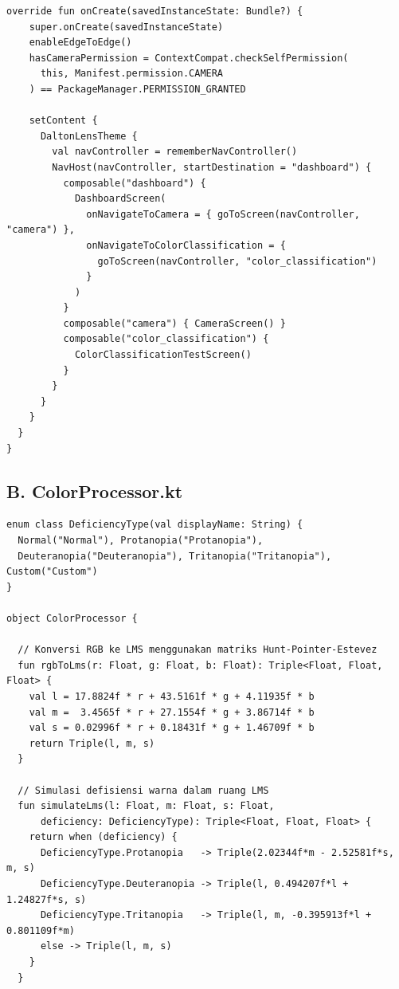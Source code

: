 {\begin{lstlisting}[caption={Entry point aplikasi dan konfigurasi navigasi antar layar}, label={lst:mainactivity}]
  override fun onCreate(savedInstanceState: Bundle?) {
    super.onCreate(savedInstanceState)
    enableEdgeToEdge()
    hasCameraPermission = ContextCompat.checkSelfPermission(
      this, Manifest.permission.CAMERA
    ) == PackageManager.PERMISSION_GRANTED

    setContent {
      DaltonLensTheme {
        val navController = rememberNavController()
        NavHost(navController, startDestination = "dashboard") {
          composable("dashboard") {
            DashboardScreen(
              onNavigateToCamera = { goToScreen(navController, "camera") },
              onNavigateToColorClassification = {
                goToScreen(navController, "color_classification")
              }
            )
          }
          composable("camera") { CameraScreen() }
          composable("color_classification") {
            ColorClassificationTestScreen()
          }
        }
      }
    }
  }
}
\end{lstlisting}

\subsection*{B. ColorProcessor.kt}

\begin{lstlisting}[caption={Implementasi konversi ruang warna RGB--LMS dan pembangkitan matriks transformasi defisiensi serta daltonisasi}, label={lst:colorprocessor}]
enum class DeficiencyType(val displayName: String) {
  Normal("Normal"), Protanopia("Protanopia"),
  Deuteranopia("Deuteranopia"), Tritanopia("Tritanopia"), Custom("Custom")
}

object ColorProcessor {

  // Konversi RGB ke LMS menggunakan matriks Hunt-Pointer-Estevez
  fun rgbToLms(r: Float, g: Float, b: Float): Triple<Float, Float, Float> {
    val l = 17.8824f * r + 43.5161f * g + 4.11935f * b
    val m =  3.4565f * r + 27.1554f * g + 3.86714f * b
    val s = 0.02996f * r + 0.18431f * g + 1.46709f * b
    return Triple(l, m, s)
  }

  // Simulasi defisiensi warna dalam ruang LMS
  fun simulateLms(l: Float, m: Float, s: Float,
      deficiency: DeficiencyType): Triple<Float, Float, Float> {
    return when (deficiency) {
      DeficiencyType.Protanopia   -> Triple(2.02344f*m - 2.52581f*s, m, s)
      DeficiencyType.Deuteranopia -> Triple(l, 0.494207f*l + 1.24827f*s, s)
      DeficiencyType.Tritanopia   -> Triple(l, m, -0.395913f*l + 0.801109f*m)
      else -> Triple(l, m, s)
    }
  }


\end{lstlisting}}
